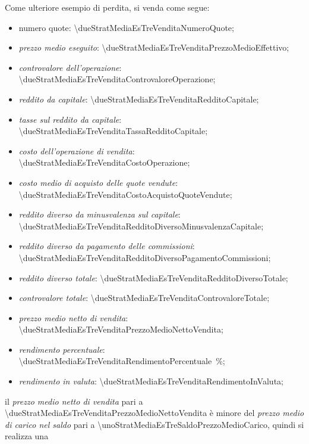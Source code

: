 \documentclass[12pt,a4paper]{article}
\newcommand{\Eur}[1]{\SI{#1}{\text{\euro{}}}}
\begin{document}

Come ulteriore esempio di perdita, si venda come segue:
\begin{itemize}
\item numero quote: \num{\dueStratMediaEsTreVenditaNumeroQuote};
\item \emph{prezzo medio eseguito}: \Eur{\dueStratMediaEsTreVenditaPrezzoMedioEffettivo};
\item \emph{controvalore dell'operazione}: \Eur{\dueStratMediaEsTreVenditaControvaloreOperazione};

\item \emph{reddito da capitale}: \Eur{\dueStratMediaEsTreVenditaRedditoCapitale};
\item \emph{tasse sul reddito da capitale}: \Eur{\dueStratMediaEsTreVenditaTassaRedditoCapitale};

\item \emph{costo dell'operazione di vendita}: \Eur{\dueStratMediaEsTreVenditaCostoOperazione};
\item \emph{costo medio di acquisto delle quote vendute}: \Eur{\dueStratMediaEsTreVenditaCostoAcquistoQuoteVendute};
\item \emph{reddito diverso da minusvalenza sul capitale}: \Eur{\dueStratMediaEsTreVenditaRedditoDiversoMinusvalenzaCapitale};
\item \emph{reddito diverso da pagamento delle commissioni}: \Eur{\dueStratMediaEsTreVenditaRedditoDiversoPagamentoCommissioni};
\item \emph{reddito diverso totale}: \Eur{\dueStratMediaEsTreVenditaRedditoDiversoTotale};

\item \emph{controvalore totale}: \Eur{\dueStratMediaEsTreVenditaControvaloreTotale};

\item \emph{prezzo medio netto di vendita}: \Eur{\dueStratMediaEsTreVenditaPrezzoMedioNettoVendita};
\item \emph{rendimento percentuale}: \SI{\dueStratMediaEsTreVenditaRendimentoPercentuale}{\percent};
\item \emph{rendimento in valuta}: \Eur{\dueStratMediaEsTreVenditaRendimentoInValuta};
\end{itemize}
il         \emph{prezzo        medio         netto         di         vendita}        pari         a
\Eur{\dueStratMediaEsTreVenditaPrezzoMedioNettoVendita} è  minore del  \emph{prezzo medio  di carico
   nel  saldo}  pari  a  \Eur{\unoStratMediaEsTreSaldoPrezzoMedioCarico},  quindi  si  realizza  una
\end{document}
